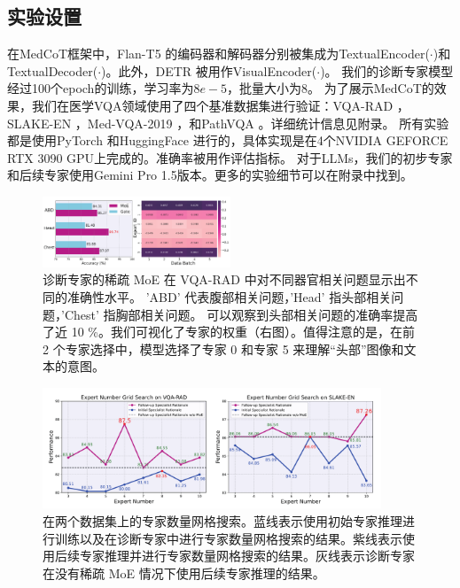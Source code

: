 \documentclass[11pt]{article}
\begin{document}
\subsection{实验设置}
在MedCoT框架中，Flan-T5 \cite{khashabi2020unifiedqa,raffel2020exploring}的编码器和解码器分别被集成为TextualEncoder($\cdot$)和TextualDecoder($\cdot$)。此外，DETR \cite{carion2020end}被用作VisualEncoder($\cdot$)。
我们的诊断专家模型经过100个epoch的训练，学习率为$8e-5$，批量大小为8。
为了展示MedCoT的效果，我们在医学VQA领域使用了四个基准数据集进行验证：VQA-RAD \cite{lau2018dataset}，SLAKE-EN \cite{liu2021slake}，Med-VQA-2019 \cite{abacha2019vqa}，和PathVQA \cite{he2020pathvqa}。详细统计信息见附录。
所有实验都是使用PyTorch \cite{paszke2019pytorch}和HuggingFace \cite{wolf2020transformers}进行的，具体实现是在4个NVIDIA GEFORCE RTX 3090 GPU上完成的。准确率被用作评估指标。
对于LLMs，我们的初步专家和后续专家使用Gemini Pro 1.5版本。更多的实验细节可以在附录中找到。

\begin{figure}
\centering
\includegraphics[width=0.5\textwidth]{image/RAD-v4.pdf}
\caption{
诊断专家的稀疏 MoE 在 VQA-RAD 中对不同器官相关问题显示出不同的准确性水平。
'ABD' 代表腹部相关问题，'Head' 指头部相关问题，'Chest' 指胸部相关问题。
可以观察到头部相关问题的准确率提高了近 10 \%。我们可视化了专家的权重（右图）。值得注意的是，在前 2 个专家选择中，模型选择了专家 0 和专家 5 来理解“头部”图像和文本的意图。
}
\label{rad}
\end{figure}

\begin{figure}
\centering
\includegraphics[width=0.9\textwidth]{image/zhexiantu_all_v6.pdf}
\caption{在两个数据集上的专家数量网格搜索。蓝线表示使用初始专家推理进行训练以及在诊断专家中进行专家数量网格搜索的结果。紫线表示使用后续专家推理并进行专家数量网格搜索的结果。灰线表示诊断专家在没有稀疏 MoE 情况下使用后续专家推理的结果。}
\label{zhexiantu-all}
\vspace{-1em}
\end{figure}
\end{document}

